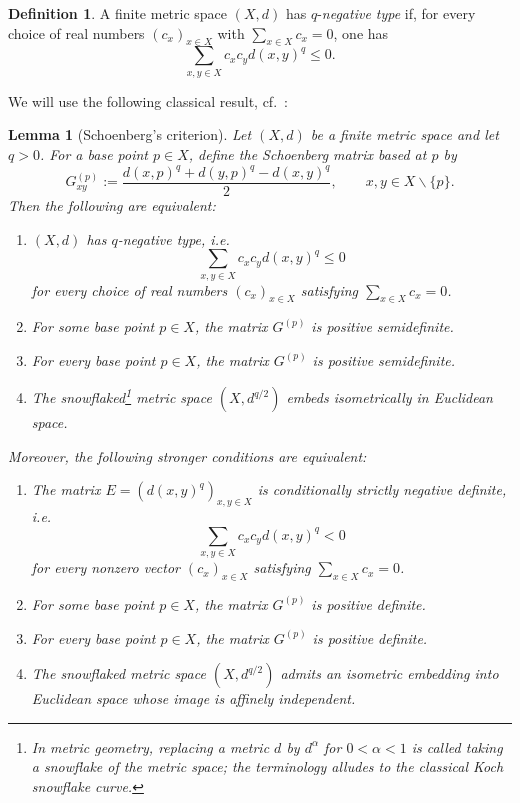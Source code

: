 \documentclass[12pt]{amsart}
\newtheorem{lemma}[theorem]{Lemma}
\theoremstyle{definition}
\newtheorem{definition}[theorem]{Definition}
\newcommand{\1}{\mathbf{1}}
\renewcommand{\setminus}{\backslash}
\begin{document}
\begin{definition}
A finite metric space $(X,d)$ has $q$-\emph{negative type} if, for every
choice of real numbers $(c_x)_{x\in X}$ with $\sum_{x\in X}c_x=0$, one has
\[
        \sum_{x,y\in X} c_xc_y d(x,y)^q \le 0.
\]

We will use the following classical result, cf.~\cite{Schoenberg1938}:

\begin{lemma}[Schoenberg's criterion]
\label{lem:q5-schoenberg}
Let $(X,d)$ be a finite metric space and let $q>0$. For a base point
$p\in X$, define the Schoenberg matrix based at $p$ by
\[
        G^{(p)}_{xy}
        :=
        \frac{d(x,p)^q+d(y,p)^q-d(x,y)^q}{2},
        \qquad x,y\in X\setminus\{p\}.
\]
Then the following are equivalent:
\begin{enumerate}
\item $(X,d)$ has $q$-negative type, i.e.
\[
        \sum_{x,y\in X} c_xc_y d(x,y)^q \le 0
\]
for every choice of real numbers $(c_x)_{x\in X}$ satisfying
$\sum_{x\in X} c_x=0$.
\item For some base point $p\in X$, the matrix $G^{(p)}$ is positive
semidefinite.
\item For every base point $p\in X$, the matrix $G^{(p)}$ is positive
semidefinite.
\item The snowflaked\footnote{In metric geometry, replacing a metric \(d\) by \(d^\alpha\) for \(0<\alpha<1\) is called taking a \emph{snowflake} of the metric space; the terminology alludes to the classical Koch snowflake curve.}
metric space $(X,d^{q/2})$ embeds isometrically in Euclidean space.
\end{enumerate}
Moreover, the following stronger conditions are equivalent:
\begin{enumerate}
\item[\rm (a)] The matrix $E=(d(x,y)^q)_{x,y\in X}$ is conditionally strictly
negative definite, i.e.
\[
        \sum_{x,y\in X} c_xc_y d(x,y)^q < 0
\]
for every nonzero vector $(c_x)_{x\in X}$ satisfying $\sum_{x\in X}c_x=0$.
\item[\rm (b)] For some base point $p\in X$, the matrix $G^{(p)}$ is positive
definite.
\item[\rm (c)] For every base point $p\in X$, the matrix $G^{(p)}$ is positive
definite.
\item[\rm (d)] The snowflaked metric space $(X,d^{q/2})$ admits an isometric
embedding into Euclidean space whose image is affinely independent.
\end{enumerate}
\end{lemma}


\end{definition}
\end{document}

